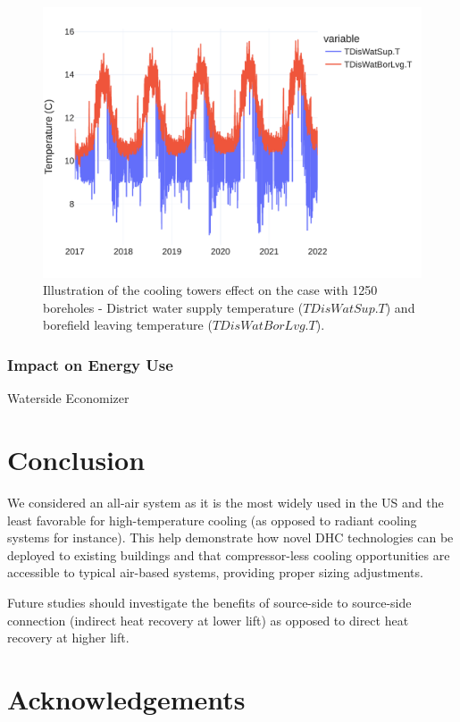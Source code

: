 \begin{figure}[!htbp]
\centering
\includegraphics[width=.7\linewidth]{../python_scripts/figures/GeoBestCaseT.pdf}
\caption{Illustration of the cooling towers effect on the case with 1250 boreholes - District water supply temperature ($TDisWatSup.T$) and borefield leaving temperature ($TDisWatBorLvg.T$).}
\label{fig:coolingeffect}
\end{figure}


\subsubsection{Impact on Energy Use} \label{sec:energy}

Waterside Economizer







\section{Conclusion} \label{sec:concl}

We considered an all-air system as it is the most widely used in the US and the least favorable for high-temperature cooling (as opposed to radiant cooling systems for instance).
This help demonstrate how novel DHC technologies can be deployed to existing buildings and that compressor-less cooling opportunities are accessible to typical air-based systems, providing proper sizing adjustments.

Future studies should investigate the benefits of source-side to source-side connection (indirect heat recovery at lower lift) as opposed to direct heat recovery at higher lift.

\section{Acknowledgements} \label{sec:acknowledge}
